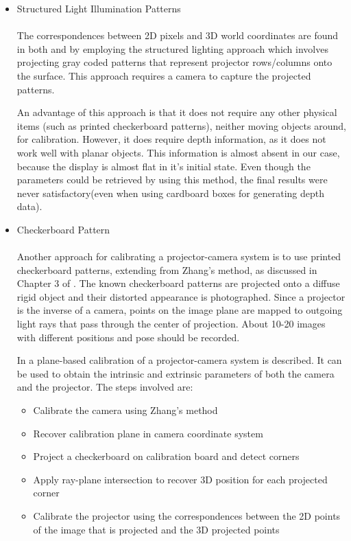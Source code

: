 \documentclass[]{article}
\begin{document}
\begin{itemize}
\item Structured Light Illumination Patterns
\\
\\The correspondences between 2D pixels and 3D world coordinates are found in both \cite{radhwan11} and \cite{yamazaki11} by employing the structured lighting approach which involves projecting gray coded patterns that represent projector rows/columns onto the surface. This approach requires a camera to capture the projected patterns.

An advantage of this approach is that it does not require any other physical items (such as printed checkerboard patterns), neither moving objects around, for calibration. However, it does require depth information, as it does not work well with planar objects. This information is almost absent in our case, because the display is almost flat in it's initial state. Even though the parameters could be retrieved by using this method, the final results were never satisfactory(even when using cardboard boxes for generating depth data).\\
\item Checkerboard Pattern\\
\\Another approach for calibrating a projector-camera system is to use printed checkerboard patterns, extending from Zhang's method, as discussed in Chapter 3 of \cite{lanman09}. The known checkerboard patterns are projected onto a diffuse rigid object and their distorted appearance is photographed. Since a projector is the inverse of a camera, points on the image plane are mapped to outgoing light rays that pass through the center of projection. About 10-20 images with different positions and pose should be recorded.

In \cite{falcao08} a plane-based calibration of a projector-camera system is described. It can be used to obtain the intrinsic and extrinsic parameters of both the camera and the projector. The steps involved are:
\begin{itemize}
\item Calibrate the camera using Zhang's method
\item Recover calibration plane in camera coordinate system
\item Project a checkerboard on calibration board and detect corners
\item Apply ray-plane intersection to recover 3D position for each projected corner
\item Calibrate the projector using the correspondences between the 2D points of the image that is projected and the 3D projected points
\end{itemize}



\end{itemize}
\end{document}
